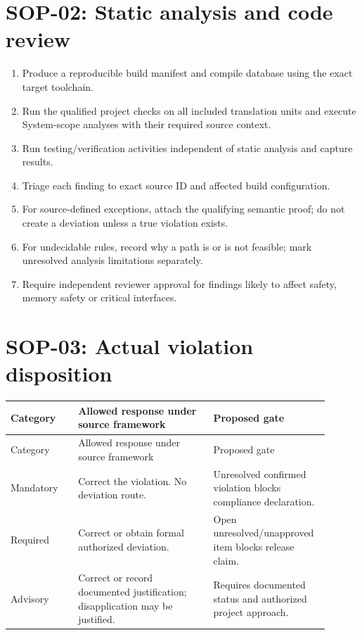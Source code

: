 \documentclass[10pt,letterpaper]{article}
\begin{document}
\section{SOP-02: Static analysis and code review}
\begin{enumerate}
\item Produce a reproducible build manifest and compile database using the exact target toolchain.
\item Run the qualified project checks on all included translation units and execute System-scope analyses with their required source context.
\item Run testing/verification activities independent of static analysis and capture results.
\item Triage each finding to exact source ID and affected build configuration.
\item For source-defined exceptions, attach the qualifying semantic proof; do not create a deviation unless a true violation exists.
\item For undecidable rules, record why a path is or is not feasible; mark unresolved analysis limitations separately.
\item Require independent reviewer approval for findings likely to affect safety, memory safety or critical interfaces.
\end{enumerate}

\section{SOP-03: Actual violation disposition}
\small\setlength{\tabcolsep}{3pt}\renewcommand{\arraystretch}{1.15}
\begin{longtable}{p{0.2\linewidth}p{0.4\linewidth}p{0.3\linewidth}}
\toprule
Category & Allowed response under source framework & Proposed gate\\ \midrule
\endfirsthead
\toprule
Category & Allowed response under source framework & Proposed gate\\ \midrule
\endhead
Mandatory & Correct the violation. No deviation route. & Unresolved confirmed violation blocks compliance declaration.\\
Required & Correct or obtain formal authorized deviation. & Open unresolved/unapproved item blocks release claim.\\
Advisory & Correct or record documented justification; disapplication may be justified. & Requires documented status and authorized project approach.\\
\bottomrule
\end{longtable}
\normalsize
\end{document}
